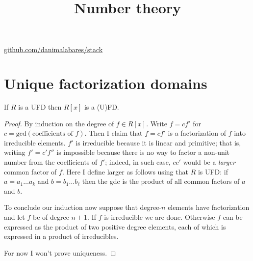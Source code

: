 



\title{Number theory}
\maketitle

\label{section-phantom}
\hfill
\href{http://github.com/danimalabares/stack}{github.com/danimalabares/stack}

\tableofcontents




\section{Unique factorization domains}
\label{section-UFD}

\begin{lemma}
\label{lemma-Gauss}
If $R$ is a UFD then $R[x]$ is a (U)FD.
\end{lemma}

\begin{proof}
By induction on the degree of $f \in R[x]$. Write $f=cf'$ for
$c=\text{gcd}(\text{coefficients of $f$})$. Then I claim that $f=cf'$ is a
factorization of $f$ into irreducible elements. $f'$ is irreducible because it
is linear and primitive; that is, writing $f'=c'f''$ is impossible because
there is no way to factor a non-unit number from the coefficients of $f'$;
indeed, in such case, $cc'$ would be a {\it larger} common factor of $f$. Here I
define larger as follows using that $R$ is UFD: if $a=a_1\ldots a_k$ and
$b=b_1\ldots b_\ell$ then the gdc is the product of all common factors of $a$
and $b$.

To conclude our induction now suppose that degree-$n$ elements have
factorization and let $f$ be of degree $n+1$. If $f$ is irreducible we are done.
Otherwise $f$ can be expressed as the product of two positive degree elements,
each of which is expressed in a product of irreducibles.

For now I won't prove uniqueness.
\end{proof}





